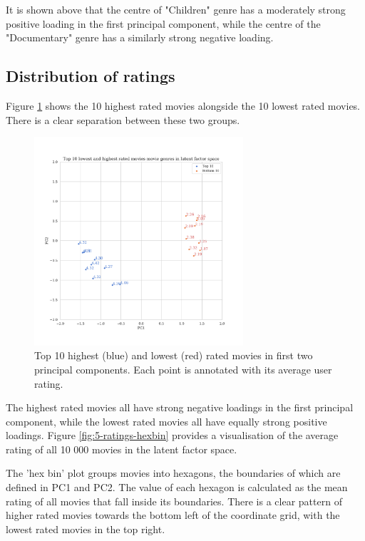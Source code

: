It is shown above that the centre of "Children" genre has a moderately strong positive loading in the first principal component, while the centre of the "Documentary" genre has a similarly strong negative loading.

\subsection{Distribution of ratings}
Figure \ref{fig:5-ratings-scatter} shows the 10 highest rated movies alongside the 10 lowest rated movies. There is a clear separation between these two groups.

\begin{figure}[H]
\centering
\includegraphics[width=0.69\textwidth]{Figures/5_ml10m-ratings-scatter.pdf}
\decoRule
\caption[Top 10 highest and lowest rated movies]{Top 10 highest (blue) and lowest (red) rated movies in first two principal components. Each point is annotated with its average user rating.}
\label{fig:5-ratings-scatter}
\end{figure}

The highest rated movies all have strong negative loadings in the first principal component, while the lowest rated movies all have equally strong positive loadings. Figure \ref{fig:5-ratings-hexbin} provides a visualisation of the average rating of all 10 000 movies in the latent factor space.

The 'hex bin' plot groups movies into hexagons, the boundaries of which are defined in PC1 and PC2. The value of each hexagon is calculated as the mean rating of all movies that fall inside its boundaries. There is a clear pattern of higher rated movies towards the bottom left of the coordinate grid, with the lowest rated movies in the top right.

